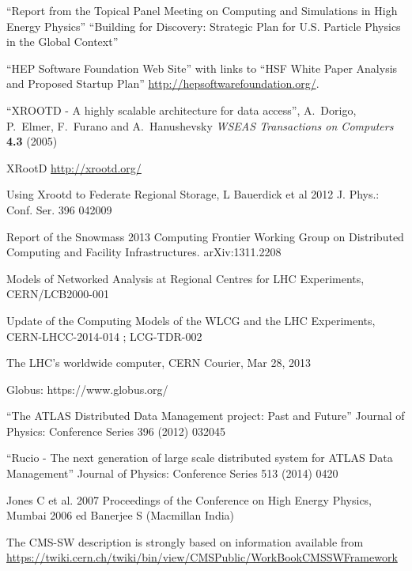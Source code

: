 \begin{thebibliography}{99}
 ``Report from the Topical Panel Meeting on Computing and
Simulations in High Energy Physics''
 ``Building for Discovery: Strategic Plan for U.S. Particle Physics in the Global Context''

 ``HEP Software Foundation Web Site'' with links to ``HSF White Paper Analysis and Proposed Startup Plan'' \url{http://hepsoftwarefoundation.org/}.

 ``XROOTD - A highly scalable architecture for data access'', A.\ Dorigo, P.\ Elmer, F.\ Furano and A.\ Hanushevsky {\it WSEAS Transactions on Computers} {\bf 4.3} (2005)

 XRootD \url{http://xrootd.org/}

 Using Xrootd to Federate Regional Storage, L Bauerdick et al 2012 J. Phys.: Conf. Ser. 396 042009

 Report of the Snowmass 2013 Computing Frontier Working Group on Distributed Computing and Facility Infrastructures. arXiv:1311.2208

 Models of Networked Analysis at Regional Centres for LHC Experiments, CERN/LCB2000-001

 Update of the Computing Models of the WLCG and the LHC Experiments, CERN-LHCC-2014-014 ; LCG-TDR-002

 The LHC’s worldwide computer, CERN Courier, Mar 28, 2013

 Globus: https://www.globus.org/

 ``The ATLAS Distributed Data Management project: Past and Future'' Journal of Physics: Conference Series 396 (2012) 032045

 ``Rucio - The next generation of large scale distributed system for ATLAS Data Management'' Journal of Physics: Conference Series 513 (2014) 0420


 Jones C et al. 2007 Proceedings of the Conference on High Energy Physics, Mumbai 2006 ed Banerjee S (Macmillan India)

 The CMS-SW description is strongly based on information available from \url{https://twiki.cern.ch/twiki/bin/view/CMSPublic/WorkBookCMSSWFramework}


\end{thebibliography}
